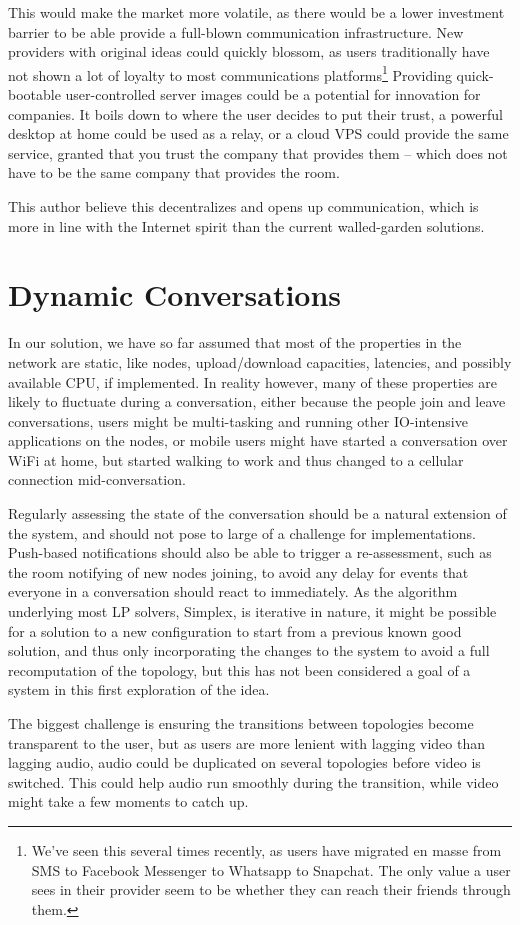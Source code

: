 This would make the market more volatile, as there would be a lower investment barrier to be able provide a full-blown communication infrastructure. New providers with original ideas could quickly blossom, as users traditionally have not shown a lot of loyalty to most communications platforms\footnote{We've seen this several times recently, as users have migrated en masse from SMS to Facebook Messenger to Whatsapp to Snapchat. The only value a user sees in their provider seem to be whether they can reach their friends through them.} Providing quick-bootable user-controlled server images could be a potential for innovation for companies. It boils down to where the user decides to put their trust, a powerful desktop at home could be used as a relay, or a cloud VPS could provide the same service, granted that you trust the company that provides them -- which does not have to be the same company that provides the room.

This author believe this decentralizes and opens up communication, which is more in line with the Internet spirit than the current walled-garden solutions.


\section{Dynamic Conversations}\label{sec:dynamic-conversations}

In our solution, we have so far assumed that most of the properties in the network are static, like nodes, upload/download capacities, latencies, and possibly available CPU, if implemented. In reality however, many of these properties are likely to fluctuate during a conversation, either because the people join and leave conversations, users might be multi-tasking and running other IO-intensive applications on the nodes, or mobile users might have started a conversation over WiFi at home, but started walking to work and thus changed to a cellular connection mid-conversation.

Regularly assessing the state of the conversation should be a natural extension of the system, and should not pose to large of a challenge for implementations. Push-based notifications should also be able to trigger a re-assessment, such as the room notifying of new nodes joining, to avoid any delay for events that everyone in a conversation should react to immediately. As the algorithm underlying most LP solvers, Simplex, is iterative in nature, it might be possible for a solution to a new configuration to start from a previous known good solution, and thus only incorporating the changes to the system to avoid a full recomputation of the topology, but this has not been considered a goal of a system in this first exploration of the idea.

The biggest challenge is ensuring the transitions between topologies become transparent to the user, but as users are more lenient with lagging video than lagging audio, audio could be duplicated on several topologies before video is switched. This could help audio run smoothly during the transition, while video might take a few moments to catch up.

